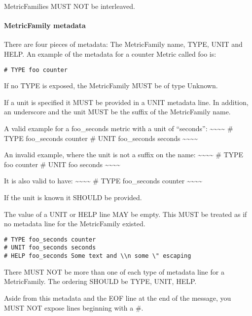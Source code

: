 \documentclass[a4paper,12pt,notitlepage,twoside,openright]{article}
\begin{document}
MetricFamilies MUST NOT be interleaved.

\hypertarget{metricfamily-metadata}{%
\paragraph{MetricFamily metadata}\label{metricfamily-metadata}}

There are four pieces of metadata: The MetricFamily name, TYPE, UNIT and
HELP. An example of the metadata for a counter Metric called foo is:

\begin{verbatim}
# TYPE foo counter
\end{verbatim}

If no TYPE is exposed, the MetricFamily MUST be of type Unknown.

If a unit is specified it MUST be provided in a UNIT metadata line. In
addition, an underscore and the unit MUST be the suffix of the
MetricFamily name.

A valid example for a foo\_seconds metric with a unit of ``seconds'':
\textasciitilde\textasciitilde\textasciitilde\textasciitilde{} \# TYPE
foo\_seconds counter \# UNIT foo\_seconds seconds
\textasciitilde\textasciitilde\textasciitilde\textasciitilde{}

An invalid example, where the unit is not a suffix on the name:
\textasciitilde\textasciitilde\textasciitilde\textasciitilde{} \# TYPE
foo counter \# UNIT foo seconds
\textasciitilde\textasciitilde\textasciitilde\textasciitilde{}

It is also valid to have:
\textasciitilde\textasciitilde\textasciitilde\textasciitilde{} \# TYPE
foo\_seconds counter
\textasciitilde\textasciitilde\textasciitilde\textasciitilde{}

If the unit is known it SHOULD be provided.

The value of a UNIT or HELP line MAY be empty. This MUST be treated as
if no metadata line for the MetricFamily existed.

\begin{verbatim}
# TYPE foo_seconds counter
# UNIT foo_seconds seconds
# HELP foo_seconds Some text and \\n some \" escaping
\end{verbatim}

There MUST NOT be more than one of each type of metadata line for a
MetricFamily. The ordering SHOULD be TYPE, UNIT, HELP.

Aside from this metadata and the EOF line at the end of the message, you
MUST NOT expose lines beginning with a \#.
\end{document}
